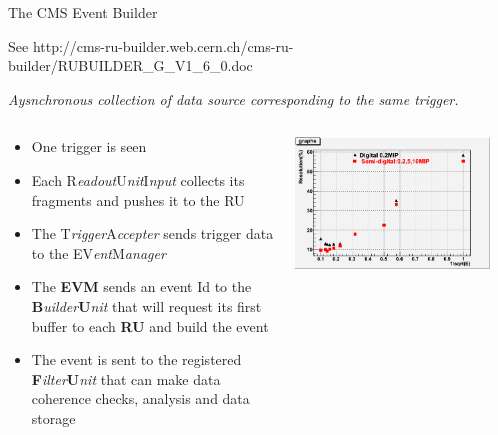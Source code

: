 \documentclass[10pt]{beamer}
\begin{document}
\begin{frame}[shrink=5]{The CMS Event Builder}

See {\tiny http://cms-ru-builder.web.cern.ch/cms-ru-builder/RUBUILDER\_G\_V1\_6\_0.doc}



{\sl Aysnchronous collection of data source corresponding to the same trigger.}

\bigskip
\begin{columns}
   \begin{column}{0.5\textwidth}
    \begin{itemize}
      \item {\small One trigger is seen}
      \item {\small Each R{\sl eadout}U{\sl nit}I{\sl nput} collects its fragments and pushes it to the RU}
      \item {\small The T{\sl rigger}A{\sl ccepter} sends trigger data to the EV{\sl ent}M{\sl anager} }
      \item {\small The {\bf EVM} sends an event Id to the {\bf B}{\sl uilder}{\bf U}{\sl nit} that will request its first buffer to each {\bf RU} and build the event}
      \item {\small The event is sent to the registered {\bf F}{\sl ilter}{\bf U}{\sl nit} that can make data coherence checks, analysis and data storage}
    \end{itemize}
  \end{column}

  \begin{column}{0.65\textwidth}
    \centerline{\includegraphics[width=0.9\textwidth]{images/DigitalSemiDigital}}
  \end{column}
\end{columns}
\end{frame}
\end{document}
